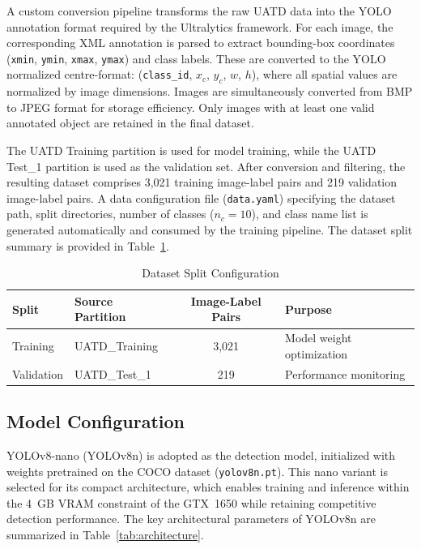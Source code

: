 \documentclass[conference]{IEEEtran}
\begin{document}
A custom conversion pipeline transforms the raw UATD data into the YOLO annotation format required by the Ultralytics framework. For each image, the corresponding XML annotation is parsed to extract bounding-box coordinates (\texttt{xmin}, \texttt{ymin}, \texttt{xmax}, \texttt{ymax}) and class labels. These are converted to the YOLO normalized centre-format: (\texttt{class\_id}, $x_c$, $y_c$, $w$, $h$), where all spatial values are normalized by image dimensions. Images are simultaneously converted from BMP to JPEG format for storage efficiency. Only images with at least one valid annotated object are retained in the final dataset.

The UATD Training partition is used for model training, while the UATD Test\_1 partition is used as the validation set. After conversion and filtering, the resulting dataset comprises 3,021 training image-label pairs and 219 validation image-label pairs. A data configuration file (\texttt{data.yaml}) specifying the dataset path, split directories, number of classes ($n_c = 10$), and class name list is generated automatically and consumed by the training pipeline. The dataset split summary is provided in Table~\ref{tab:splits}.

\begin{table}[!t]
\caption{Dataset Split Configuration}
\label{tab:splits}
\centering
\begin{tabular}{@{}l l c l@{}}
\toprule
\textbf{Split} & \textbf{Source Partition} & \textbf{Image-Label Pairs} & \textbf{Purpose} \\
\midrule
Training   & UATD\_Training & 3,021 & Model weight optimization \\
Validation & UATD\_Test\_1  & 219   & Performance monitoring \\
\bottomrule
\end{tabular}
\end{table}

\subsection{Model Configuration}

YOLOv8-nano (YOLOv8n) is adopted as the detection model, initialized with weights pretrained on the COCO dataset (\texttt{yolov8n.pt}). This nano variant is selected for its compact architecture, which enables training and inference within the 4~GB VRAM constraint of the GTX~1650 while retaining competitive detection performance. The key architectural parameters of YOLOv8n are summarized in Table~\ref{tab:architecture}.
\end{document}
